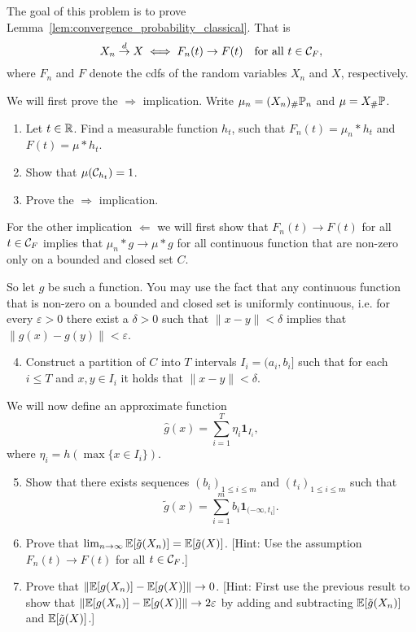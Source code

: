 \begin{problem}\label{prb:convergence_distribution}
The goal of this problem is to prove Lemma~\ref{lem:convergence_probability_classical}. That is
\[
	X_n \stackrel{d}{\rightarrow} X \iff F_n(t) \to F(t) \quad \text{for all } t \in \mathcal C_F,
\]
where $F_n$ and $F$ denote the cdfs of the random variables $X_n$ and $X$, respectively.
 
We will first prove the $\Rightarrow$ implication. Write $\mu_n = (X_n)_\# \mathbb P_n$ and $\mu = X_\# \mathbb P$.
\begin{enumerate}
\item Let $t \in \mathbb R$. Find a measurable function $h_t$, such that $F_n(t) = \mu_n \ast h_t$ and $F(t) = \mu \ast h_t$.
\item Show that $\mu(\mathcal C_{h_t}) = 1$.
\item Prove the $\Rightarrow$ implication. 
\end{enumerate}

For the other implication $\Leftarrow$ we will first show that $F_n(t) \to F(t)$ for all $t \in \mathcal C_F$ implies that $\mu_n \ast g \to \mu \ast g$ for all continuous function that are non-zero only on a bounded and closed set $C$.

So let $g$ be such a function. You may use the fact that any continuous function that is non-zero on a bounded and closed set is uniformly continuous, i.e. for every $\varepsilon > 0$ there exist a $\delta > 0$ such that $\|x-y\| < \delta$ implies that $\|g(x) - g(y)\| < \varepsilon$. 
\begin{enumerate}
\setcounter{enumi}{3}
\item Construct a partition of $C$ into $T$ intervals $I_i = (a_i, b_i]$ such that for each $i \le T$ and $x, y \in I_i$ it holds that $\|x - y\| < \delta$.
\end{enumerate}

We will now define an approximate function
\[
	\hat{g}(x) = \sum_{i = 1}^T \eta_i \mathbf{1}_{I_i},
\]
where $\eta_i = h(\max\{x \in I_i\})$.

\begin{enumerate}
\setcounter{enumi}{4}
\item Show that there exists sequences $(b_i)_{1 \le i \le m}$ and $(t_i)_{1 \le i \le m}$ such that
\[
	\tilde{g}(x) = \sum_{i = 1}^m b_i \mathbf{1}_{(-\infty, t_i]}.
\]
\item Prove that $\lim_{n \to \infty} \mathbb E[\tilde{g}(X_n)] = \mathbb E[\tilde{g}(X)]$. [Hint: Use the assumption $F_n(t) \to F(t)$ for all $t \in \mathcal C_F$.]
\item Prove that $\|\mathbb E[g(X_n)] - \mathbb E[g(X)]\| \to 0$. [Hint: First use the previous result to show that $\|\mathbb E[g(X_n)] - \mathbb E[g(X)]\| \to 2\varepsilon$ by adding and subtracting $\mathbb E[\tilde{g}(X_n)]$ and $\mathbb E[\tilde{g}(X)]$.]
\end{enumerate}


\end{problem}
